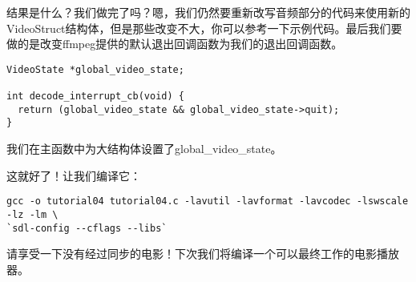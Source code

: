 结果是什么？我们做完了吗？嗯，我们仍然要重新改写音频部分的代码来使用新的VideoStruct结构体，但是那些改变不大，你可以参考一下示例代码。最后我们要做的是改变ffmpeg提供的默认退出回调函数为我们的退出回调函数。

\begin{lstlisting}
VideoState *global_video_state;

int decode_interrupt_cb(void) {
  return (global_video_state && global_video_state->quit);
}
\end{lstlisting}

我们在主函数中为大结构体设置了global_video_state。

这就好了！让我们编译它：
\begin{lstlisting}
gcc -o tutorial04 tutorial04.c -lavutil -lavformat -lavcodec -lswscale -lz -lm \
`sdl-config --cflags --libs`
\end{lstlisting}

请享受一下没有经过同步的电影！下次我们将编译一个可以最终工作的电影播放器。
